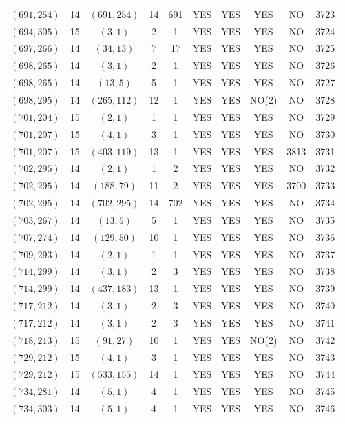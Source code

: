 \begin{longtable}{|c|c|c|c|c|c|c|c|c|c|}
$(691, 254)$ & 14 & $(691, 254)$ & 14 & 691 & YES & YES & YES & NO & 3723\\
$(694, 305)$ & 15 & $(3, 1)$ & 2 & 1 & YES & YES & YES & NO & 3724\\
$(697, 266)$ & 14 & $(34, 13)$ & 7 & 17 & YES & YES & YES & NO & 3725\\
$(698, 265)$ & 14 & $(3, 1)$ & 2 & 1 & YES & YES & YES & NO & 3726\\
$(698, 265)$ & 14 & $(13, 5)$ & 5 & 1 & YES & YES & YES & NO & 3727\\
$(698, 295)$ & 14 & $(265, 112)$ & 12 & 1 & YES & YES & NO(2) & NO & 3728\\
$(701, 204)$ & 15 & $(2, 1)$ & 1 & 1 & YES & YES & YES & NO & 3729\\
$(701, 207)$ & 15 & $(4, 1)$ & 3 & 1 & YES & YES & YES & NO & 3730\\
$(701, 207)$ & 15 & $(403, 119)$ & 13 & 1 & YES & YES & YES & 3813 & 3731\\
$(702, 295)$ & 14 & $(2, 1)$ & 1 & 2 & YES & YES & YES & NO & 3732\\
$(702, 295)$ & 14 & $(188, 79)$ & 11 & 2 & YES & YES & YES & 3700 & 3733\\
$(702, 295)$ & 14 & $(702, 295)$ & 14 & 702 & YES & YES & YES & NO & 3734\\
$(703, 267)$ & 14 & $(13, 5)$ & 5 & 1 & YES & YES & YES & NO & 3735\\
$(707, 274)$ & 14 & $(129, 50)$ & 10 & 1 & YES & YES & YES & NO & 3736\\
$(709, 293)$ & 14 & $(2, 1)$ & 1 & 1 & YES & YES & YES & NO & 3737\\
$(714, 299)$ & 14 & $(3, 1)$ & 2 & 3 & YES & YES & YES & NO & 3738\\
$(714, 299)$ & 14 & $(437, 183)$ & 13 & 1 & YES & YES & YES & NO & 3739\\
$(717, 212)$ & 14 & $(3, 1)$ & 2 & 3 & YES & YES & YES & NO & 3740\\
$(717, 212)$ & 14 & $(3, 1)$ & 2 & 3 & YES & YES & YES & NO & 3741\\
$(718, 213)$ & 15 & $(91, 27)$ & 10 & 1 & YES & YES & NO(2) & NO & 3742\\
$(729, 212)$ & 15 & $(4, 1)$ & 3 & 1 & YES & YES & YES & NO & 3743\\
$(729, 212)$ & 15 & $(533, 155)$ & 14 & 1 & YES & YES & YES & NO & 3744\\
$(734, 281)$ & 14 & $(5, 1)$ & 4 & 1 & YES & YES & YES & NO & 3745\\
$(734, 303)$ & 14 & $(5, 1)$ & 4 & 1 & YES & YES & YES & NO & 3746\\

\end{longtable}

